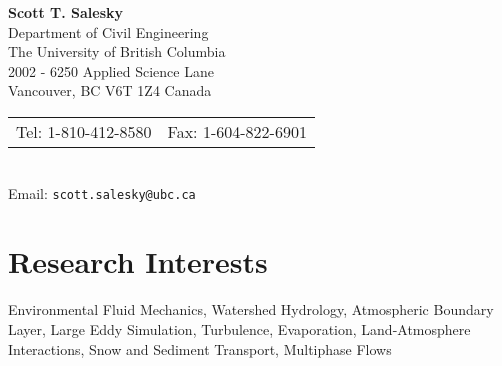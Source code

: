 \documentclass[11pt,letterpaper]{article}
\begin{document}

\pagestyle{empty}           %
\pagestyle{fancy}
\fancyfoot{}                        %
\fancyhead{}                        %
\renewcommand{\headrulewidth}{0pt}

\begin{center}
    \textbf{\Large Scott T. Salesky} \\
    Department of Civil Engineering \\
    The University of British Columbia \\
    2002 - 6250 Applied Science Lane \\
    Vancouver, BC V6T 1Z4 Canada \\
    \begin{tabular}{c c}
        Tel: 1-810-412-8580 & Fax: 1-604-822-6901
    \end{tabular} \\
    Email: \texttt{scott.salesky@ubc.ca}
\end{center}

\section*{Research Interests} 

Environmental Fluid Mechanics, Watershed Hydrology, Atmospheric Boundary Layer,
Large Eddy Simulation, Turbulence, Evaporation, Land-Atmosphere Interactions,
Snow and Sediment Transport, Multiphase Flows

\end{document}
